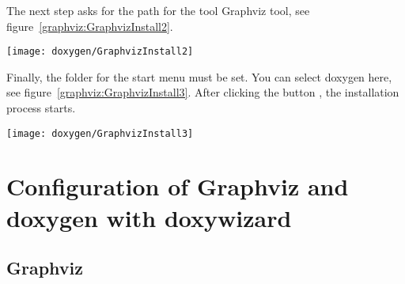     
    
The next step asks for the path for the tool Graphviz tool, see figure~\ref{graphviz:GraphvizInstall2}.
    
\begin{center}
    \texttt{[image: doxygen/GraphvizInstall2]}
    \label{graphviz:GraphvizInstall2}
\end{center} 
    
Finally, the folder for the start menu must be set. You can select doxygen here, see figure~\ref{graphviz:GraphvizInstall3}. After clicking the button , the installation process starts.
    
\begin{center}
    \texttt{[image: doxygen/GraphvizInstall3]}
    \label{graphviz:GraphvizInstall2}
\end{center} 

    
    
    
%    
%    
%			
%				
%			
%



\section{Configuration of Graphviz and doxygen with doxywizard}


\subsection{Graphviz}

